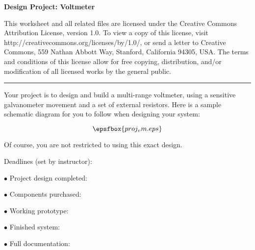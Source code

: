 
\centerline{\bf Design Project: Voltmeter} \bigskip 
 
This worksheet and all related files are licensed under the Creative Commons Attribution License, version 1.0.  To view a copy of this license, visit http://creativecommons.org/licenses/by/1.0/, or send a letter to Creative Commons, 559 Nathan Abbott Way, Stanford, California 94305, USA.  The terms and conditions of this license allow for free copying, distribution, and/or modification of all licensed works by the general public.

\bigskip 

\hrule

\vskip 10pt

Your project is to design and build a multi-range voltmeter, using a sensitive galvanometer movement and a set of external resistors.  Here is a sample schematic diagram for you to follow when designing your system:

$$\epsfbox{proj_vm.eps}$$

Of course, you are not restricted to using this exact design.

\vskip 10pt

\noindent
Deadlines (set by instructor):

\medskip
\item{$\bullet$} Project design completed: 
\item{$\bullet$} Components purchased:
\item{$\bullet$} Working prototype:
\item{$\bullet$} Finished system:
\item{$\bullet$} Full documentation:
\medskip



